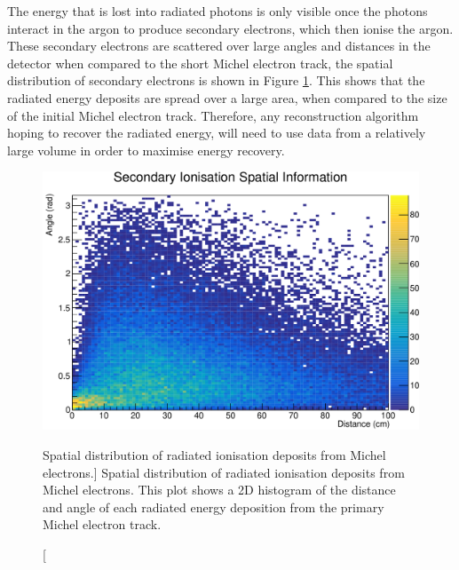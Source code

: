 The energy that is lost into radiated photons is only visible once the photons
interact in the argon to produce secondary electrons, which then ionise the
argon. These secondary electrons are scattered over large angles and distances
in the detector when compared to the short Michel electron track, the spatial
distribution of secondary electrons is shown in Figure \ref{fig:photon_geom}.
This shows that the radiated energy deposits are spread over a large area, when
compared to the size of the initial Michel electron track. Therefore, any
reconstruction algorithm hoping to recover the radiated energy, will
need to use data from a relatively large volume in order to maximise energy
recovery.
\begin{figure}
	\centering
	\includegraphics[width=\textwidth]{figures/photon_geom.pdf}
	\caption
	[Spatial distribution of radiated ionisation deposits from Michel electrons.]
	{Spatial distribution of radiated ionisation deposits from Michel electrons.
	This plot shows a 2D histogram of the distance and angle of each radiated
	energy deposition from the primary Michel electron track.}
	\label{fig:photon_geom}
\end{figure}

